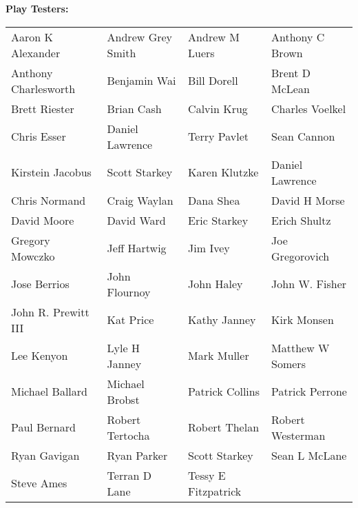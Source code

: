 \textbf{Play Testers:}\\
\begin{tabular}{ l l l l }
Aaron K Alexander & Andrew Grey Smith & Andrew M Luers & Anthony C Brown\\
Anthony Charlesworth & Benjamin Wai & Bill Dorell & Brent D McLean\\
Brett Riester & Brian Cash & Calvin Krug & Charles Voelkel\\
Chris Esser & Daniel Lawrence & Terry Pavlet & Sean Cannon\\
Kirstein Jacobus & Scott Starkey & Karen Klutzke & Daniel Lawrence\\
Chris Normand & Craig Waylan & Dana Shea & David H Morse\\
David Moore & David Ward & Eric Starkey & Erich Shultz\\
Gregory Mowczko & Jeff Hartwig & Jim Ivey & Joe Gregorovich\\
Jose Berrios & John Flournoy & John Haley & John W. Fisher\\
John R. Prewitt III & Kat Price & Kathy Janney & Kirk Monsen\\
Lee Kenyon & Lyle H Janney & Mark Muller & Matthew W Somers\\
Michael Ballard & Michael Brobst & Patrick Collins & Patrick Perrone\\
Paul Bernard & Robert Tertocha & Robert Thelan & Robert Westerman\\
Ryan Gavigan & Ryan Parker & Scott Starkey & Sean L McLane\\
Steve Ames & Terran D Lane & Tessy E Fitzpatrick
\end{tabular}